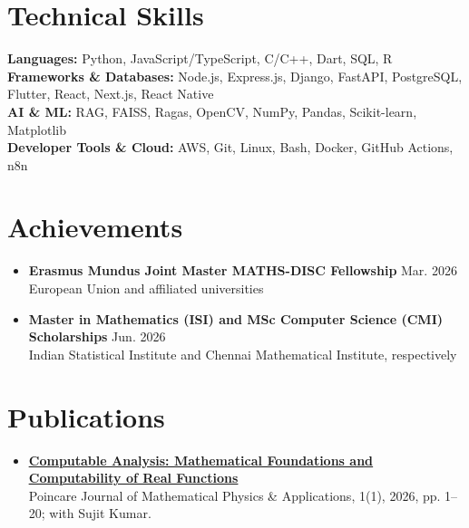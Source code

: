 \documentclass[letterpaper,11pt]{article}
\newcommand{\resumeSubHeadingListStart}{\begin{itemize}[leftmargin=0.15in, label={}, topsep=3pt, itemsep=5pt, parsep=0pt]}
\newcommand{\resumeSubHeadingListEnd}{\end{itemize}}
\begin{document}
\section{Technical Skills}
\begin{itemize}[leftmargin=0.15in, label={}, topsep=2pt, itemsep=0pt, parsep=0pt]
  \small{\item{
        \textbf{Languages:} Python, JavaScript/TypeScript, C/C++, Dart, SQL, R \\
        \textbf{Frameworks \& Databases:} Node.js, Express.js, Django, FastAPI, PostgreSQL, Flutter, React, Next.js, React Native \\
        \textbf{AI \& ML:} RAG, FAISS, Ragas, OpenCV, NumPy, Pandas, Scikit-learn, Matplotlib \\
        \textbf{Developer Tools \& Cloud:} AWS, Git, Linux, Bash, Docker, GitHub Actions, n8n
        }}
\end{itemize}

\section{Achievements}
\resumeSubHeadingListStart
\item \small{\textbf{Erasmus Mundus Joint Master MATHS-DISC Fellowship} \hfill Mar. 2026\\
European Union and affiliated universities}
\item \small{\textbf{Master in Mathematics (ISI) and MSc Computer Science (CMI) Scholarships} \hfill Jun. 2026\\
Indian Statistical Institute and Chennai Mathematical Institute, respectively}
\resumeSubHeadingListEnd

\section{Publications}
\resumeSubHeadingListStart
\item \small{\href{https://doi.org/10.46753/pjmpa.2026.v01i01.001}{\underline{\textbf{Computable Analysis: Mathematical Foundations and Computability of Real Functions}}}\\
Poincare Journal of Mathematical Physics \& Applications, 1(1), 2026, pp. 1--20; with Sujit Kumar.}
\resumeSubHeadingListEnd

\end{document}
